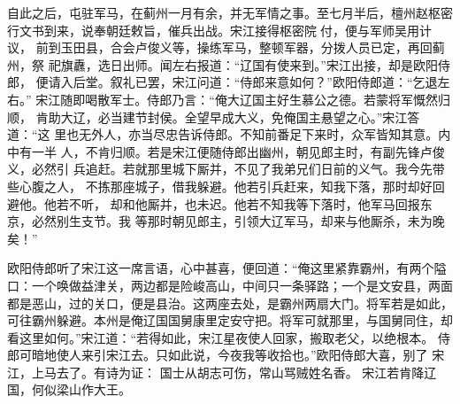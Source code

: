 自此之后，屯驻军马，在蓟州一月有余，并无军情之事。至七月半后，檀州赵枢密
行文书到来，说奉朝廷敕旨，催兵出战。宋江接得枢密院付，便与军师吴用计议，
前到玉田县，合会卢俊义等，操练军马，整顿军器，分拨人员已定，再回蓟州，祭
祀旗纛，选日出师。闻左右报道：“辽国有使来到。”宋江出接，却是欧阳侍郎，
便请入后堂。叙礼已罢，宋江问道：“侍郎来意如何？”欧阳侍郎道：“乞退左右。”
宋江随即喝散军士。侍郎乃言：“俺大辽国主好生慕公之德。若蒙将军慨然归顺，
肯助大辽，必当建节封侯。全望早成大义，免俺国主悬望之心。”宋江答道：“这
里也无外人，亦当尽忠告诉侍郎。不知前番足下来时，众军皆知其意。内中有一半
人，不肯归顺。若是宋江便随侍郎出幽州，朝见郎主时，有副先锋卢俊义，必然引
兵追赶。若就那里城下厮并，不见了我弟兄们日前的义气。我今先带些心腹之人，
不拣那座城子，借我躲避。他若引兵赶来，知我下落，那时却好回避他。他若不听，
却和他厮并，也未迟。他若不知我等下落时，他军马回报东京，必然别生支节。我
等那时朝见郎主，引领大辽军马，却来与他厮杀，未为晚矣！”

欧阳侍郎听了宋江这一席言语，心中甚喜，便回道：“俺这里紧靠霸州，有两个隘
口：一个唤做益津关，两边都是险峻高山，中间只一条驿路；一个是文安县，两面
都是恶山，过的关口，便是县治。这两座去处，是霸州两扇大门。将军若是如此，
可往霸州躲避。本州是俺辽国国舅康里定安守把。将军可就那里，与国舅同住，却
看这里如何。”宋江道：“若得如此，宋江星夜使人回家，搬取老父，以绝根本。
侍郎可暗地使人来引宋江去。只如此说，今夜我等收拾也。”欧阳侍郎大喜，别了
宋江，上马去了。有诗为证：
国士从胡志可伤，常山骂贼姓名香。
宋江若肯降辽国，何似梁山作大王。

